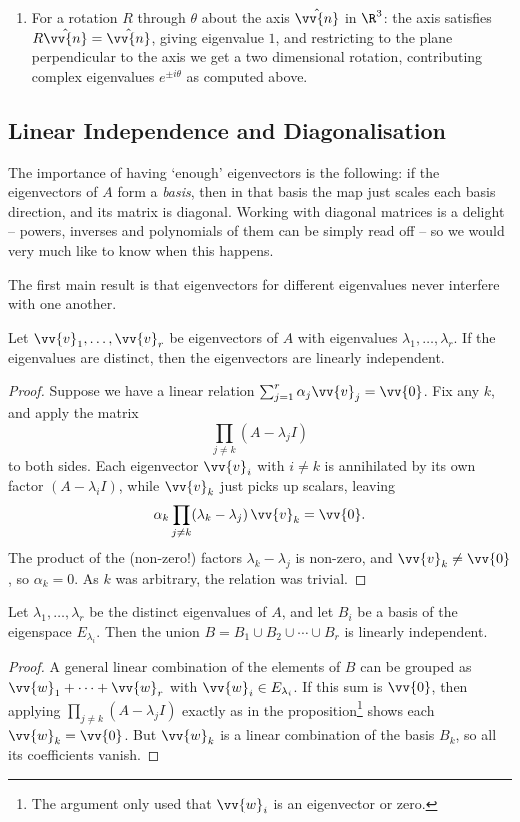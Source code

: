 \begin{example}[Multiplicities]
\begin{enumerate}[label=(\roman*)]
		\item For a rotation $R$ through $\theta$ about the axis $\hat{\vv{n}}$ in $\R^3$: the axis satisfies $R \hat{\vv{n}} = \hat{\vv{n}}$, giving eigenvalue $1$, and restricting to the plane perpendicular to the axis we get a two dimensional rotation, contributing complex eigenvalues $e^{\pm i \theta}$ as computed above.
	\end{enumerate}
\end{example}

\subsection{Linear Independence and Diagonalisation}

The importance of having `enough' eigenvectors is the following: if the eigenvectors of $A$ form a \emph{basis}, then in that basis the map just scales each basis direction, and its matrix is diagonal. Working with diagonal matrices is a delight -- powers, inverses and polynomials of them can be simply read off -- so we would very much like to know when this happens.

The first main result is that eigenvectors for different eigenvalues never interfere with one another.

\begin{proposition}
	Let $\vv{v}_1, \dots, \vv{v}_r$ be eigenvectors of $A$ with eigenvalues $\lambda_1, \dots, \lambda_r$. If the eigenvalues are distinct, then the eigenvectors are linearly independent.
\end{proposition}
\begin{proof}
	Suppose we have a linear relation $\sum_{j = 1}^r \alpha_j \vv{v}_j = \vv{0}$. Fix any $k$, and apply the matrix
	$$
	\prod_{j \neq k}(A - \lambda_j I)
	$$
	to both sides. Each eigenvector $\vv{v}_i$ with $i \neq k$ is annihilated by its own factor $(A - \lambda_i I)$, while $\vv{v}_k$ just picks up scalars, leaving
	$$
	\alpha_k \prod_{j \neq k}(\lambda_k - \lambda_j) \, \vv{v}_k = \vv{0}.
	$$
	The product of the (non-zero!) factors $\lambda_k - \lambda_j$ is non-zero, and $\vv{v}_k \neq \vv{0}$, so $\alpha_k = 0$. As $k$ was arbitrary, the relation was trivial.
\end{proof}

\begin{corollary}\label{cor:eigenbases}
	Let $\lambda_1, \dots, \lambda_r$ be the distinct eigenvalues of $A$, and let $B_i$ be a basis of the eigenspace $E_{\lambda_i}$. Then the union $B = B_1 \cup B_2 \cup \cdots \cup B_r$ is linearly independent.
\end{corollary}
\begin{proof}
	A general linear combination of the elements of $B$ can be grouped as $\vv{w}_1 + \cdots + \vv{w}_r$ with $\vv{w}_i \in E_{\lambda_i}$. If this sum is $\vv{0}$, then applying $\prod_{j \neq k}(A - \lambda_jI)$ exactly as in the proposition\footnote{The argument only used that $\vv{w}_i$ is an eigenvector or zero.} shows each $\vv{w}_k = \vv{0}$. But $\vv{w}_k$ is a linear combination of the basis $B_k$, so all its coefficients vanish.
\end{proof}

